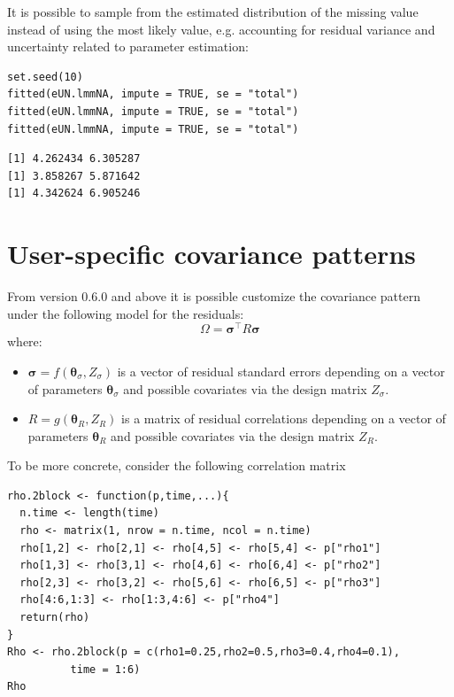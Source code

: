 \documentclass[12pt]{article}
\newcommand\trans[1]{{#1}^\intercal}%
\begin{document}
It is possible to sample from the estimated distribution of the
missing value instead of using the most likely value, e.g. accounting
for residual variance and uncertainty related to parameter estimation:
\lstset{language=r,label= ,caption= ,captionpos=b,numbers=none}
\begin{lstlisting}
set.seed(10)
fitted(eUN.lmmNA, impute = TRUE, se = "total")
fitted(eUN.lmmNA, impute = TRUE, se = "total")
fitted(eUN.lmmNA, impute = TRUE, se = "total")
\end{lstlisting}

\begin{verbatim}
[1] 4.262434 6.305287
[1] 3.858267 5.871642
[1] 4.342624 6.905246
\end{verbatim}


\clearpage

\section{User-specific covariance patterns}
\label{sec:org4cbd373}

From version 0.6.0 and above it is possible customize the covariance
pattern under the following model for the residuals:
\[\Omega = \trans{\boldsymbol{\sigma}} R \boldsymbol{\sigma}\]
where:
\begin{itemize}
\item \(\boldsymbol{\sigma}=f(\boldsymbol{\theta}_{\sigma},Z_{\sigma})\)
is a vector of residual standard errors depending on a vector of
parameters \(\boldsymbol{\theta}_{\sigma}\) and possible covariates
via the design matrix \(Z_{\sigma}\).
\item \(R=g(\boldsymbol{\theta}_{R},Z_R)\) is a matrix of residual
correlations depending on a vector of parameters
\(\boldsymbol{\theta}_{R}\) and possible covariates via the design
matrix \(Z_R\).
\end{itemize}

\bigskip

To be more concrete, consider the following correlation matrix
\lstset{language=r,label= ,caption= ,captionpos=b,numbers=none}
\begin{lstlisting}
rho.2block <- function(p,time,...){
  n.time <- length(time)
  rho <- matrix(1, nrow = n.time, ncol = n.time)
  rho[1,2] <- rho[2,1] <- rho[4,5] <- rho[5,4] <- p["rho1"]
  rho[1,3] <- rho[3,1] <- rho[4,6] <- rho[6,4] <- p["rho2"]
  rho[2,3] <- rho[3,2] <- rho[5,6] <- rho[6,5] <- p["rho3"]
  rho[4:6,1:3] <- rho[1:3,4:6] <- p["rho4"]
  return(rho)
}
Rho <- rho.2block(p = c(rho1=0.25,rho2=0.5,rho3=0.4,rho4=0.1),
		  time = 1:6)
Rho
\end{lstlisting}
\end{document}
